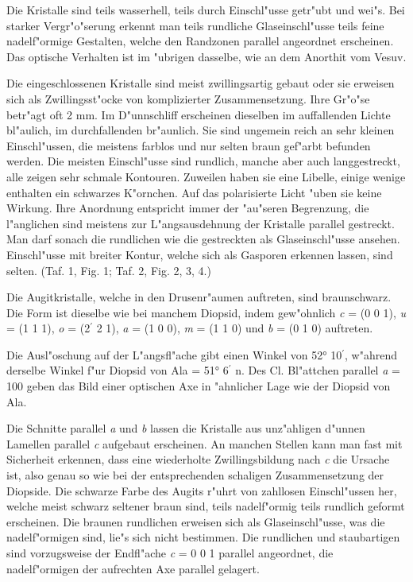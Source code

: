 \documentclass[a4paper, 11pt, oneside, polutonikogreek, german]{article}
\begin{document}
Die Kristalle sind teils wasserhell, teils durch Einschl"usse getr"ubt und wei"s. Bei starker Vergr"o"serung erkennt man teils rundliche Glaseinschl"usse teils feine nadelf"ormige Gestalten, welche den Randzonen parallel angeordnet erscheinen. Das optische Verhalten ist im "ubrigen dasselbe, wie an dem Anorthit vom Vesuv.

Die eingeschlossenen Kristalle sind meist zwillingsartig gebaut oder sie erweisen sich als Zwillingsst"ocke von komplizierter Zusammensetzung. Ihre Gr"o"se betr"agt oft 2 mm. Im D"unnschliff erscheinen dieselben im auffallenden Lichte bl"aulich, im durchfallenden br"aunlich. Sie sind ungemein reich an sehr kleinen Einschl"ussen, die meistens farblos und nur selten braun gef"arbt befunden werden. Die meisten Einschl"usse sind rundlich, manche aber auch langgestreckt, alle zeigen sehr schmale Kontouren. Zuweilen haben sie eine Libelle, einige wenige enthalten ein schwarzes K"ornchen. Auf das polarisierte Licht "uben sie keine Wirkung. Ihre Anordnung entspricht immer der "au"seren Begrenzung, die l"anglichen sind meistens zur L"angsausdehnung der Kristalle parallel gestreckt. Man darf sonach die rundlichen wie die gestreckten als Glaseinschl"usse ansehen. Einschl"usse mit breiter Kontur, welche sich als Gasporen erkennen lassen, sind selten. (Taf. 1, Fig. 1; Taf. 2, Fig. 2, 3, 4.)

Die Augitkristalle, welche in den Drusenr"aumen auftreten, sind braunschwarz. Die Form ist dieselbe wie bei manchem Diopsid, indem gew"ohnlich \emph{c} = (0 0 1), \emph{u} = (1 1 1), \emph{o} = (2$^{\prime}$ 2 1), \emph{a} = (1 0 0), \emph{m} = (1 1 0) und \emph{b} = (0 1 0) auftreten.

Die Ausl"oschung auf der L"angsfl"ache gibt einen Winkel von 52° 10$^{\prime}$, w"ahrend derselbe Winkel f"ur Diopsid von Ala = 51° 6$^{\prime}$ n. Des Cl. Bl"attchen parallel \emph{a} = 100 geben das Bild einer optischen Axe in "ahnlicher Lage wie der Diopsid von Ala.

Die Schnitte parallel \emph{a} und \emph{b} lassen die Kristalle aus unz"ahligen d"unnen Lamellen parallel \emph{c} aufgebaut erscheinen. An manchen Stellen kann man fast mit Sicherheit erkennen, dass eine wiederholte Zwillingsbildung nach \emph{c} die Ursache ist, also genau so wie bei der entsprechenden schaligen Zusammensetzung der Diopside. Die schwarze Farbe des Augits r"uhrt von zahllosen Einschl"ussen her, welche meist schwarz seltener braun sind, teils nadelf"ormig teils rundlich geformt erscheinen. Die braunen rundlichen erweisen sich als Glaseinschl"usse, was die nadelf"ormigen sind, lie"s sich nicht bestimmen. Die rundlichen und staubartigen sind vorzugsweise der Endfl"ache \emph{c} = 0 0 1 parallel angeordnet, die nadelf"ormigen der aufrechten Axe parallel gelagert.
\end{document}
